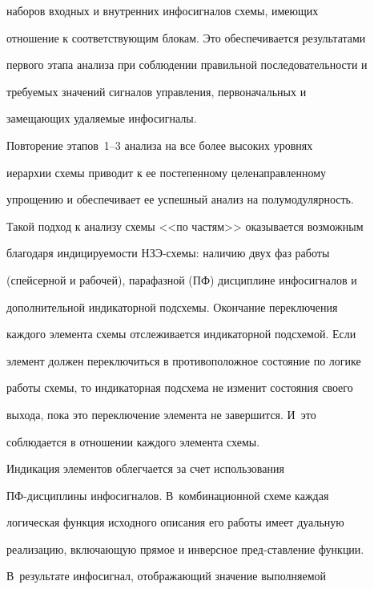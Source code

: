 наборов входных и внутренних инфосигналов схемы, имеющих


отношение к соответствующим блокам. Это обеспечивается результатами


первого этапа анализа при соблюдении правильной последовательности и


тре\-бу\-емых значений сигналов управления, первоначальных и


замещающих удаляемые инфосигналы.





   Повторение этапов~1--3 анализа на все более высоких уровнях


иерархии схемы приводит к ее постепенному целенаправленному


упрощению и обеспечивает ее успешный анализ на полумодулярность.





   Такой подход к анализу схемы <<по частям>> оказывается возможным


благодаря индицируемости НЗЭ-схе\-мы: наличию двух фаз работы


(спейсерной и рабочей), парафазной (ПФ) дисциплине инфосигналов и


дополнительной индикаторной подсхемы. Окончание переключения


каждого элемента схемы отслеживается индикаторной подсхемой. Если


элемент должен пере\-клю\-чить\-ся в противоположное состояние по логике


работы схемы, то индикаторная подсхема не изменит состояния своего


выхода, пока это переключение элемента не завершится. И~это


соблюдается в отношении каждого элемента схемы.





   Индикация элементов облегчается за счет использования\linebreak


   ПФ-дис\-ци\-пли\-ны инфосигналов. В~комбинационной схеме каждая


логическая функция исходного описания его работы имеет дуальную


реализацию, включающую прямое и инверсное пред-\linebreak став\-ле\-ние функции.


В~результате инфосигнал, отображающий значение выполняемой


